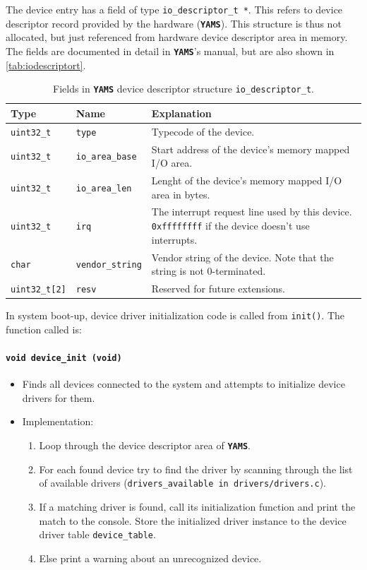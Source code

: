\documentclass[twoside,a4paper]{report}
\makeatletter
\newcommand{\PBS}[1]{\let\temp=\\#1\let\\=\temp}
\newlength{\tablewidth}
\newenvironment{function}[3]{%
\paragraph{\texttt{#1 {\textbf{#2}} (#3)}}%
\index{#2@\texttt{#2}}%
\begin{itemize}%
}{%
\end{itemize}%
}
\newenvironment{structdescription}{%
\begin{center}%
\begin{tabular}{p{3.5cm}|p{2.5cm}|>{\PBS\raggedright}p{\tablewidth-6\tabcolsep-6cm}}%
\textbf{Type} & \textbf{Name} & \textbf{Explanation} \\ %
}{%
\end{tabular}%
\end{center}%
}
\newcommand{\structfield}[3]{%
\hline%
\texttt{#1} & \texttt{#2} & #3 \\%
}
\newcommand{\yams}{\texttt{\textbf{YAMS}}}
\makeatother
\begin{document}
The device entry has a field of type \texttt{io\_descriptor\_t
*}. This refers to
device descriptor record provided by the hardware (\yams{}). This
structure is thus not allocated, but just referenced from hardware
device descriptor area in memory. The fields are documented in detail
in \yams{}'s manual, but are also shown in \autoref{tab:iodescriptort}.

\begin{table}
\begin{structdescription}

\structfield{uint32\_t}{type}{Typecode of the device.}

\structfield{uint32\_t}{io\_area\_base}{Start address of the device's
memory mapped I/O area.}

\structfield{uint32\_t}{io\_area\_len}{Lenght of the device's memory
mapped I/O area in bytes.}

\structfield{uint32\_t}{irq}{The interrupt request line used by this
device. \texttt{0xffffffff} if the device doesn't use interrupts.}

\structfield{char}{vendor\_string}{Vendor string of the device. Note
that the string is not 0-terminated.}

\structfield{uint32\_t[2]}{resv}{Reserved for future extensions.}

\end{structdescription}
\caption{Fields in \yams{} device descriptor structure
\texttt{io\_descriptor\_t}.}
\label{tab:iodescriptort}
\end{table}

In system boot-up, device driver initialization code is called from
\texttt{init()}. The function called is:

\begin{function}{void}{device\_init}{void}
\item Finds all devices connected to the system and attempts to initialize
device drivers for them.
\item Implementation:
\begin{enumerate}
\item Loop through the device descriptor area of \yams{}.
\item For each found device try to find the driver by scanning through
the list of available drivers (\texttt{drivers\_available in
\texttt{drivers/drivers.c}}).
\item If a matching driver is found, call its initialization function
and print the match to the console. Store the initialized driver
instance to the device driver table \texttt{device\_table}.
\item Else print a warning about an unrecognized device.
\end{enumerate}
\end{function}
\end{document}
